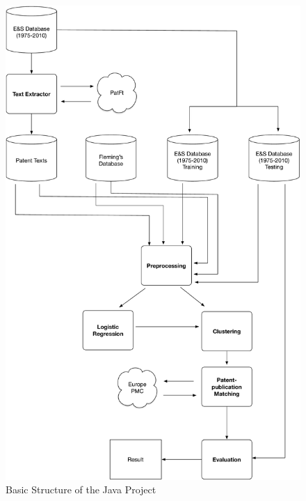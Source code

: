 \begin{figure}
\centering
\includegraphics[scale=0.5]{codeUML.pdf}
\caption{Basic Structure of the Java Project}
\end{figure}


